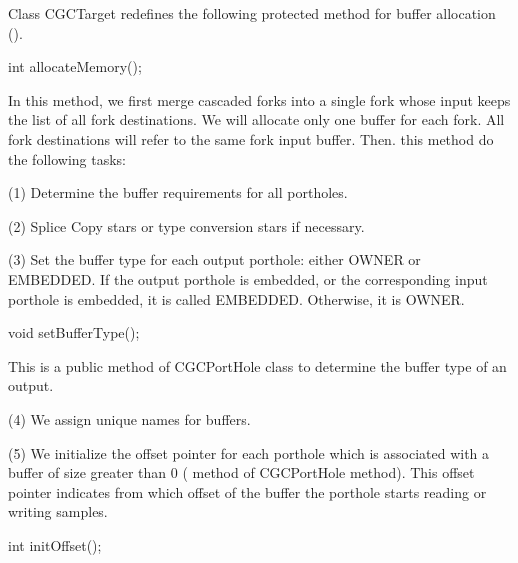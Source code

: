 Class CGCTarget redefines the
following protected method for buffer allocation ().

\begin{example}
int allocateMemory();
\end{example}

In this method, we first merge cascaded forks into a single fork whose
input keeps the list of all fork destinations. We will allocate only one
buffer for each fork. All fork destinations will refer to the same
fork input buffer. Then. this method do the following tasks:

(1) Determine the buffer requirements for all portholes.

(2) Splice Copy stars or type conversion stars if necessary.

(3) Set the buffer type for each output porthole: either OWNER or EMBEDDED.
If the output porthole is embedded, or the corresponding input porthole is
embedded, it is called EMBEDDED. Otherwise, it is OWNER.

\begin{example}
void setBufferType();
\end{example}

This is a public method of CGCPortHole class to determine the buffer type of
an output.

(4) We assign unique names for buffers.

(5) We initialize the offset pointer for each porthole which is associated
with a buffer of size greater than 0 ( method of CGCPortHole
method). This offset pointer indicates from which offset of the buffer the
porthole starts reading or writing samples.

\begin{example}
int initOffset();
\end{example}

